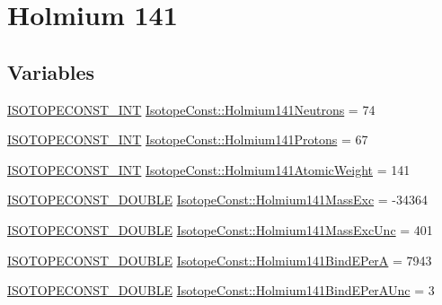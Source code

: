 \hypertarget{group___isotope_const-_holmium-_ho141}{}\section{Holmium 141}
\label{group___isotope_const-_holmium-_ho141}
\subsection*{Variables}
\begin{DoxyCompactItemize}
\item 
\mbox{\hyperlink{group___isotope_const-_macros_ga5f18360b3e99483a35c32d789e62621c}{I\+S\+O\+T\+O\+P\+E\+C\+O\+N\+S\+T\+\_\+\+I\+NT}} \mbox{\hyperlink{group___isotope_const-_holmium-_ho141_ga502089df865f51c146d514a534133444}{Isotope\+Const\+::\+Holmium141\+Neutrons}} = 74
\item 
\mbox{\hyperlink{group___isotope_const-_macros_ga5f18360b3e99483a35c32d789e62621c}{I\+S\+O\+T\+O\+P\+E\+C\+O\+N\+S\+T\+\_\+\+I\+NT}} \mbox{\hyperlink{group___isotope_const-_holmium-_ho141_ga5ae8416198d75a8e00d08a5d729cdd38}{Isotope\+Const\+::\+Holmium141\+Protons}} = 67
\item 
\mbox{\hyperlink{group___isotope_const-_macros_ga5f18360b3e99483a35c32d789e62621c}{I\+S\+O\+T\+O\+P\+E\+C\+O\+N\+S\+T\+\_\+\+I\+NT}} \mbox{\hyperlink{group___isotope_const-_holmium-_ho141_ga04cea861d831c8912c516859a95362c0}{Isotope\+Const\+::\+Holmium141\+Atomic\+Weight}} = 141
\item 
\mbox{\hyperlink{group___isotope_const-_macros_ga8f45a7272ce02c0b4c65c44636ed719a}{I\+S\+O\+T\+O\+P\+E\+C\+O\+N\+S\+T\+\_\+\+D\+O\+U\+B\+LE}} \mbox{\hyperlink{group___isotope_const-_holmium-_ho141_ga7f8df18b782a34bdeb2f3ff52a4fdc8b}{Isotope\+Const\+::\+Holmium141\+Mass\+Exc}} = -\/34364
\item 
\mbox{\hyperlink{group___isotope_const-_macros_ga8f45a7272ce02c0b4c65c44636ed719a}{I\+S\+O\+T\+O\+P\+E\+C\+O\+N\+S\+T\+\_\+\+D\+O\+U\+B\+LE}} \mbox{\hyperlink{group___isotope_const-_holmium-_ho141_ga94d181041a8ca69ae1e7d83792272f33}{Isotope\+Const\+::\+Holmium141\+Mass\+Exc\+Unc}} = 401
\item 
\mbox{\hyperlink{group___isotope_const-_macros_ga8f45a7272ce02c0b4c65c44636ed719a}{I\+S\+O\+T\+O\+P\+E\+C\+O\+N\+S\+T\+\_\+\+D\+O\+U\+B\+LE}} \mbox{\hyperlink{group___isotope_const-_holmium-_ho141_ga828553b60c824009da9082e1018e50b3}{Isotope\+Const\+::\+Holmium141\+Bind\+E\+PerA}} = 7943
\item 
\mbox{\hyperlink{group___isotope_const-_macros_ga8f45a7272ce02c0b4c65c44636ed719a}{I\+S\+O\+T\+O\+P\+E\+C\+O\+N\+S\+T\+\_\+\+D\+O\+U\+B\+LE}} \mbox{\hyperlink{group___isotope_const-_holmium-_ho141_gab9c8a571ed4c064a986c47e0ffaf8515}{Isotope\+Const\+::\+Holmium141\+Bind\+E\+Per\+A\+Unc}} = 3

\end{DoxyCompactItemize}
